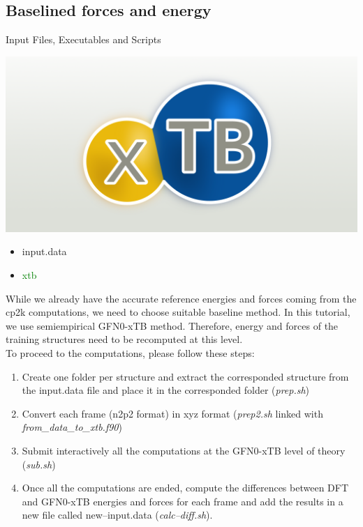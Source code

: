 \documentclass[12pt]{article}
\begin{document}
\subsection{Baselined forces and energy}
\begin{mybox2}{{Input Files, Executables and Scripts}}
\begin{minipage}[c]{0.5\linewidth}
\includegraphics[scale=0.15]{latex_files/xtb.png}
\end{minipage}
\begin{minipage}[c]{0.5\linewidth}
\begin{itemize}
    \item input.data
    \item \textcolor{green}{xtb}
\end{itemize}
\end{minipage}
\end{mybox2}
While we already have the accurate reference energies and forces coming from the cp2k computations, we need to choose suitable baseline method. In this tutorial, we use semiempirical GFN0-xTB method. Therefore, energy and forces of the training structures need to be recomputed at this level. \\
To proceed to the computations, please follow these steps:
\begin{enumerate}
    \item Create one folder per structure and extract the corresponded structure from the input.data file and place it in the corresponded folder (\textit{prep.sh})
    \item Convert each frame (n2p2 format) in xyz format (\textit{prep2.sh} linked with \textit{from\_data\_to\_xtb.f90})
    \item Submit interactively all the computations at the GFN0-xTB level of theory (\textit{sub.sh})
    \item Once all the computations are ended, compute the differences between DFT and GFN0-xTB energies and forces for each frame and add the results in a new file called new--input.data (\textit{calc--diff.sh}).
\end{enumerate}
\end{document}
